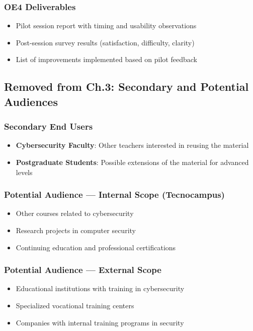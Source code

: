 \documentclass[a4paper,11pt]{article}
\begin{document}
\subsubsection{OE4 Deliverables}
\begin{itemize}
\item Pilot session report with timing and usability observations
\item Post-session survey results (satisfaction, difficulty, clarity)
\item List of improvements implemented based on pilot feedback
\end{itemize}

\subsection{Removed from Ch.3: Secondary and Potential Audiences}


\subsubsection{Secondary End Users}
\begin{itemize}
\item \textbf{Cybersecurity Faculty}: Other teachers interested in reusing the material
\item \textbf{Postgraduate Students}: Possible extensions of the material for advanced levels
\end{itemize}

\subsubsection{Potential Audience --- Internal Scope (Tecnocampus)}
\begin{itemize}
\item Other courses related to cybersecurity
\item Research projects in computer security
\item Continuing education and professional certifications
\end{itemize}

\subsubsection{Potential Audience --- External Scope}
\begin{itemize}
\item Educational institutions with training in cybersecurity
\item Specialized vocational training centers
\item Companies with internal training programs in security
\end{itemize}
\end{document}
